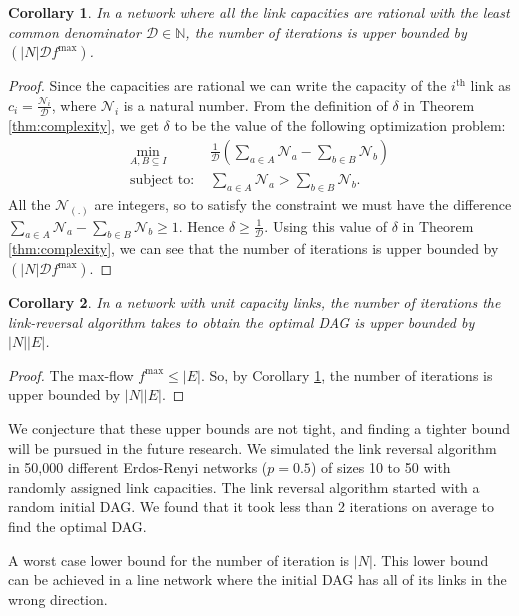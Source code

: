 \documentclass{sig-alternate-2013}
\newtheorem{corollary}{Corollary}
\begin{document}
\begin{corollary} \label{cor:integer}
In a network where all the link capacities are rational with the least common denominator $\mathcal{D} \in \mathbb{N}$, the number of iterations is upper bounded by $(|N|\mathcal{D}f^{\max})$.
\end{corollary}
\begin{proof}
Since the capacities are rational we can write the capacity of the $i^{\text{th}}$ link as $c_{i}=\frac{\mathcal{N}_i}{\mathcal{D}}$, where $\mathcal{N}_i$ is a natural number. From the definition of $\delta$ in Theorem \ref{thm:complexity}, we get $\delta$ to be the value of the following optimization problem:
\begin{align*}
\min _{A,B\subseteq I} &\frac{1}{\mathcal{D}} \left( \sum_{a\in A} \mathcal{N}_a-\sum_{b \in B}\mathcal{N}_b \right)\\
\text{subject to: } & \sum_{a\in A} \mathcal{N}_a > \sum_{b \in B}\mathcal{N}_b.
\end{align*}
All the $\mathcal{N}_{(.)}$ are integers, so to satisfy the constraint we must have the difference $\sum_{a\in A} \mathcal{N}_a - \sum_{b \in B}\mathcal{N}_b \ge 1$. Hence $\delta \ge \frac{1}{\mathcal{D}}$. Using this value of $\delta$ in Theorem \ref{thm:complexity}, we can see that the number of iterations is upper bounded by $(|N|\mathcal{D}f^{\max})$.
\end{proof}

\begin{corollary}
In a network with unit capacity links, the number of iterations the link-reversal algorithm takes to obtain the optimal DAG is upper bounded by $|N||E|$.
\end{corollary}
\begin{proof}
The max-flow $f^{\max} \le |E|$. So, by Corollary \ref{cor:integer}, the number of iterations is upper bounded by $|N||E|$.
\end{proof}

We conjecture that these upper bounds are not tight, and finding a tighter bound will be pursued in the future research. We simulated the link reversal algorithm in 50,000 different Erdos-Renyi networks ($p=0.5$) of sizes 10 to 50 with randomly assigned link capacities. The link reversal algorithm started with a random initial DAG. We found that it took less than 2 iterations on average to find the optimal DAG.

A worst case lower bound for the number of iteration is $|N|$. This lower bound can be achieved in a line network where the initial DAG has all of its links in the wrong direction.
\end{document}
